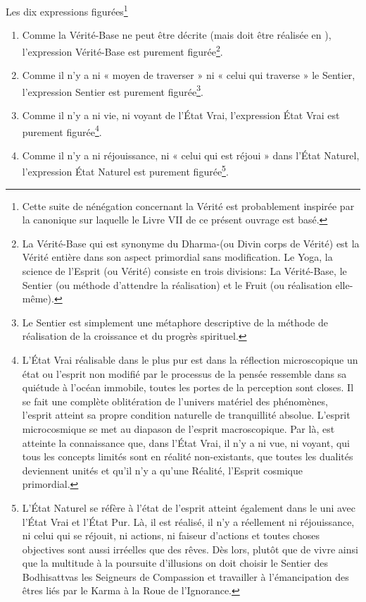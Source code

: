 \documentclass[10pt]{book}
\makeatletter
\renewcommand{\section}{\@startsection{section}{0}{0mm}
   {\baselineskip}
   {\baselineskip}{\normalfont\normalsize\scshape\centering}
}
\makeatother
\begin{document}
\section{Les dix expressions figurées\footnote{Cette suite de nénégation concernant la Vérité est probablement inspirée par la \textit{\prajnaparamita} canonique sur laquelle le Livre VII de ce présent ouvrage est basé.}}
\begin{enumerate}[1.-]
\item Comme la Vérité-Base ne peut être décrite (mais doit être réalisée en \samadhi), l'expression Vérité-Base est purement figurée\footnote{La Vérité-Base qui est synonyme du Dharma-\kaya (ou Divin corps de Vérité) est la Vérité entière dans son aspect primordial sans modification. Le Yoga, la science de l'Esprit (ou Vérité) consiste en trois divisions: La Vérité-Base, le Sentier (ou méthode d'attendre la réalisation) et le Fruit (ou réalisation elle-même).}.
\item Comme il n'y a ni « moyen de traverser » ni « celui qui traverse » le Sentier, l'expression Sentier est purement figurée\footnote{Le Sentier est simplement une métaphore descriptive de la méthode de réalisation de la croissance et du progrès spirituel.}.
\item Comme il n'y a ni vie, ni voyant de l'État Vrai, l'expression État Vrai est purement figurée\footnote{L'État Vrai réalisable dans le plus pur \samadhi est dans la réflection microscopique un état ou l'esprit non modifié par le processus de la pensée ressemble dans sa quiétude à l'océan immobile, toutes les portes de la perception sont closes. Il se fait une complète oblitération de l'univers matériel des phénomènes, l'esprit atteint sa propre condition naturelle de tranquillité absolue. L'esprit microcosmique se met au diapason de l'esprit macroscopique. Par là, est atteinte la connaissance que, dans l'État Vrai, il n'y a ni vue, ni voyant, qui tous les concepts limités sont en réalité non-existants, que toutes les dualités deviennent unités et qu'il n'y a qu'une Réalité, l'Esprit cosmique primordial.}.
\item Comme il n'y a ni réjouissance, ni « celui qui est réjoui » dans l'État Naturel, l'expression État Naturel est purement figurée\footnote{L'État Naturel se réfère à l'état de l'esprit atteint également dans le \samadhi uni avec l'État Vrai et l'État Pur. Là, il est réalisé, il n'y a réellement ni réjouissance, ni celui qui se réjouit, ni actions, ni faiseur d'actions et toutes choses objectives sont aussi irréelles que des rêves. Dès lors, plutôt que de vivre ainsi que la multitude à la poursuite d'illusions on doit choisir le Sentier des Bodhisattvas les Seigneurs de Compassion et travailler à l'émancipation des êtres liés par le Karma à la Roue de l'Ignorance.}.

\end{enumerate}
\end{document}
